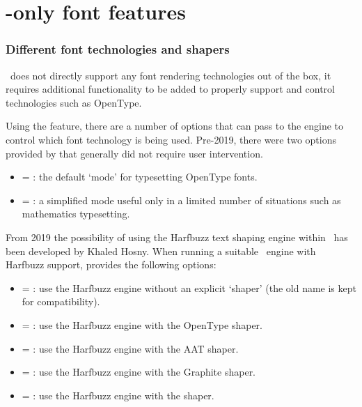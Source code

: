 \documentclass[a4paper]{l3doc}
\begin{document}
\part{\LuaTeX-only font features}
\label{sec:luatex-features}

\section{Different font technologies and shapers}
\label{sec:renderer-luatex}

\LuaTeX\ does not directly support any font rendering technologies out of the box, it
requires additional functionality to be added to properly support and control technologies such as OpenType.

Using the  feature, there are a number of options that  can pass to the engine to control which font technology is being used.
Pre-2019, there were two options provided by  that generally did not require user intervention.

\begin{itemize}
\item {} =  : the default `mode' for typesetting OpenType fonts.
\item {} =  : a simplified mode useful only in a limited number of situations such as mathematics typesetting.
\end{itemize}

From 2019 the possibility of using the Harfbuzz text shaping engine within \LuaTeX\ has
been developed by Khaled Hosny. When running a suitable \LuaTeX\ engine with Harfbuzz support,  provides the following options:

\begin{itemize}
\item {} =  : use the Harfbuzz engine without an explicit `shaper' (the old  name is kept for compatibility).
\item {} =  : use the Harfbuzz engine with the OpenType shaper.
\item {} =  : use the Harfbuzz engine with the AAT shaper.
\item {} =  : use the Harfbuzz engine with the Graphite shaper.
\item {} =  : use the Harfbuzz engine with the  shaper.
\end{itemize}
\end{document}
